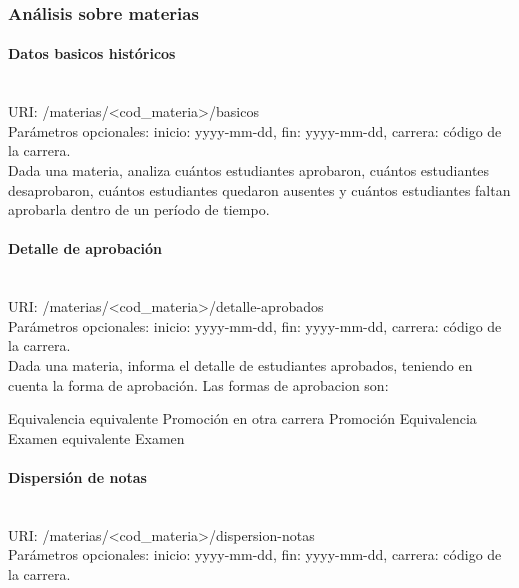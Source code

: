 \subsubsection{Análisis sobre materias}

\paragraph{Datos basicos históricos} \mbox{}\\

URI: /materias/<cod\_materia>/basicos \\

Parámetros opcionales: inicio: yyyy-mm-dd, fin: yyyy-mm-dd, carrera: código de la carrera. \\

Dada una materia, analiza cuántos estudiantes aprobaron, cuántos estudiantes desaprobaron, cuántos estudiantes quedaron ausentes y cuántos estudiantes faltan aprobarla dentro de un período de tiempo.

\paragraph{Detalle de aprobación}\mbox{}\\

URI: /materias/<cod\_materia>/detalle-aprobados \\

Parámetros opcionales: inicio: yyyy-mm-dd, fin: yyyy-mm-dd, carrera: código de la carrera. \\

Dada una materia, informa el detalle de estudiantes aprobados, teniendo en cuenta la forma de aprobación. Las formas de aprobacion son:

\begin{outline}
    \2 Equivalencia equivalente
    \2 Promoción en otra carrera
    \2 Promoción
    \2 Equivalencia
    \2 Examen equivalente
    \2 Examen
\end{outline}

\paragraph{Dispersión de notas}\mbox{}\\

URI: /materias/<cod\_materia>/dispersion-notas \\

Parámetros opcionales: inicio: yyyy-mm-dd, fin: yyyy-mm-dd, carrera: código de la carrera. \\

